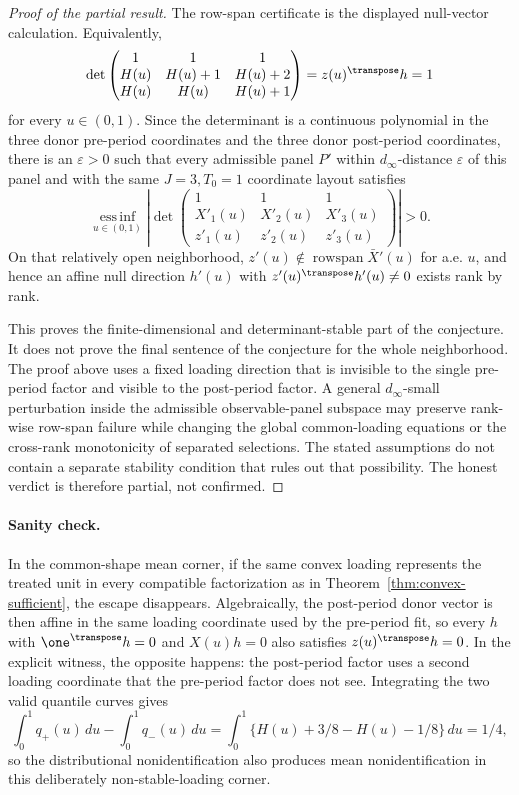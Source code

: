 \begin{proof}[Proof of the partial result]
The row-span certificate is the displayed null-vector calculation.  Equivalently,
\[
\det\begin{pmatrix}
1&1&1\\
H(u)&H(u)+1&H(u)+2\\
H(u)&H(u)&H(u)+1
\end{pmatrix}
=z(u)^\transpose h=1
\]
for every \(u\in(0,1)\).  Since the determinant is a continuous polynomial in the three donor pre-period coordinates and the three donor post-period coordinates, there is an \(\varepsilon>0\) such that every admissible panel \(P'\) within \(d_\infty\)-distance \(\varepsilon\) of this panel and with the same \(J=3,T_0=1\) coordinate layout satisfies
\[
\operatorname*{ess\,inf}_{u\in(0,1)}
\left|
\det\begin{pmatrix}
1&1&1\\
X'_1(u)&X'_2(u)&X'_3(u)\\
z'_1(u)&z'_2(u)&z'_3(u)
\end{pmatrix}
\right|>0.
\]
On that relatively open neighborhood, \(z'(u)\notin\operatorname{rowspan}\bar X'(u)\) for a.e. \(u\), and hence an affine null direction \(h'(u)\) with \(z'(u)^\transpose h'(u)\ne0\) exists rank by rank.

This proves the finite-dimensional and determinant-stable part of the conjecture.  It does not prove the final sentence of the conjecture for the whole neighborhood.  The proof above uses a fixed loading direction that is invisible to the single pre-period factor and visible to the post-period factor.  A general \(d_\infty\)-small perturbation inside the admissible observable-panel subspace may preserve rank-wise row-span failure while changing the global common-loading equations or the cross-rank monotonicity of separated selections.  The stated assumptions do not contain a separate stability condition that rules out that possibility.  The honest verdict is therefore partial, not confirmed.
\end{proof}

\paragraph{Sanity check.}
In the common-shape mean corner, if the same convex loading represents the treated unit in every compatible factorization as in Theorem~\ref{thm:convex-sufficient}, the escape disappears.  Algebraically, the post-period donor vector is then affine in the same loading coordinate used by the pre-period fit, so every \(h\) with \(\one^\transpose h=0\) and \(X(u)h=0\) also satisfies \(z(u)^\transpose h=0\).  In the explicit witness, the opposite happens: the post-period factor uses a second loading coordinate that the pre-period factor does not see.  Integrating the two valid quantile curves gives
\[
\int_0^1 q_+(u)\,du-\int_0^1 q_-(u)\,du
=\int_0^1\{H(u)+3/8-H(u)-1/8\}\,du
=1/4,
\]
so the distributional nonidentification also produces mean nonidentification in this deliberately non-stable-loading corner.

